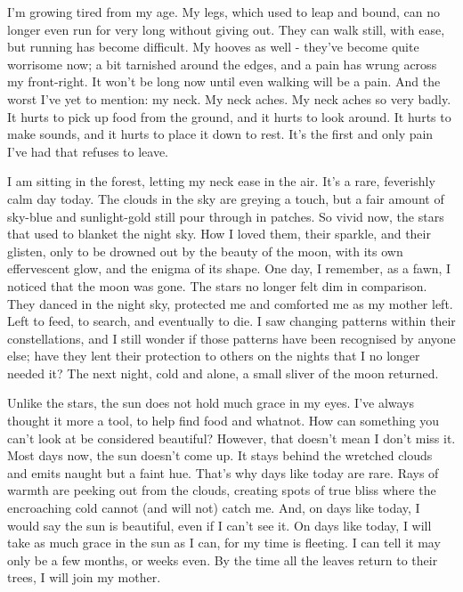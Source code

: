 I'm growing tired from my age. My legs, which used to leap and bound, can no longer
even run for very long without giving out. They can walk still, with ease, but running has
become difficult. My hooves as well - they've become quite worrisome now; a bit
tarnished around the edges, and a pain has wrung across my front-right. It won't be long
now until even walking will be a pain. And the worst I've yet to mention: my neck. My
neck aches. My neck aches so very badly. It hurts to pick up food from the ground, and it
hurts to look around. It hurts to make sounds, and it hurts to place it down to rest. It's
the first and only pain I've had that refuses to leave.

I am sitting in the forest, letting my neck ease in the air. It's a rare, feverishly calm day
today. The clouds in the sky are greying a touch, but a fair amount of sky-blue and
sunlight-gold still pour through in patches. So vivid now, the stars that used to blanket
the night sky. How I loved them, their sparkle, and their glisten, only to be drowned out
by the beauty of the moon, with its own effervescent glow, and the enigma of its shape.
One day, I remember, as a fawn, I noticed that the moon was gone. The stars no longer
felt dim in comparison. They danced in the night sky, protected me and comforted me
as my mother left. Left to feed, to search, and eventually to die. I saw changing patterns
within their constellations, and I still wonder if those patterns have been recognised by
anyone else; have they lent their protection to others on the nights that I no longer
needed it? The next night, cold and alone, a small sliver of the moon returned.

Unlike the stars, the sun does not hold much grace in my eyes. I've always thought it
more a tool, to help find food and whatnot. How can something you can't look at be
considered beautiful? However, that doesn't mean I don't miss it. Most days now, the
sun doesn't come up. It stays behind the wretched clouds and emits naught but a faint
hue. That's why days like today are rare. Rays of warmth are peeking out from the
clouds, creating spots of true bliss where the encroaching cold cannot (and will not)
catch me. And, on days like today, I would say the sun is beautiful, even if I can't see it.
On days like today, I will take as much grace in the sun as I can, for my time is fleeting. I
can tell it may only be a few months, or weeks even. By the time all the leaves return to
their trees, I will join my mother.

